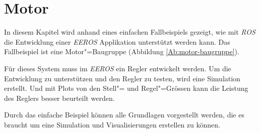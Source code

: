 \chapter{Motor}


In diesem Kapitel wird anhand eines einfachen Fallbeispiels gezeigt, wie mit \textit{ROS} die Entwicklung einer \textit{EEROS} Applikation unterstützt werden kann. 
Das Fallbeispiel ist eine Motor"=Baugruppe (Abbildung \ref{Ab:motor-baugruppe}).

Für dieses System muss im \textit{EEROS} ein Regler entwickelt werden.
Um die Entwicklung zu unterstützen und den Regler zu testen, wird eine Simulation erstellt.
Und mit Plots von den Stell"= und Regel"=Grössen kann die Leistung des Reglers besser beurteilt werden.


Durch das einfache Beispiel können alle Grundlagen vorgestellt werden, die es braucht um eine Simulation und Visualisierungen erstellen zu können.


